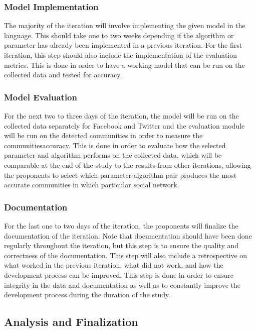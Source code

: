 \subsubsection{Model Implementation}

The majority of the iteration will involve implementing the given model in the language. This should take one to two weeks depending if the algorithm or parameter has already been implemented in a previous iteration. For the first iteration, this step should also include the implementation of the evaluation metrics. This is done in order to have a working model that can be run on the collected data and tested for accuracy.

\subsubsection{Model Evaluation}

For the next two to three days of the iteration, the model will be run on the collected data separately for Facebook and Twitter and the evaluation module will be run on the detected communities in order to measure the communities\vtick accuracy. This is done in order to evaluate how the selected parameter and algorithm performs on the collected data, which will be comparable at the end of the study to the results from other iterations, allowing the proponents to select which parameter-algorithm pair produces the most accurate communities in which particular social network.

\subsubsection{Documentation}

For the last one to two days of the iteration, the proponents will finalize the documentation of the iteration. Note that documentation should have been done regularly throughout the iteration, but this step is to ensure the quality and correctness of the documentation. This step will also include a retrospective on what worked in the previous iteration, what did not work, and how the development process can be improved. This step is done in order to ensure integrity in the data and documentation as well as to constantly improve the development process during the duration of the study.

\subsection{Analysis and Finalization}

